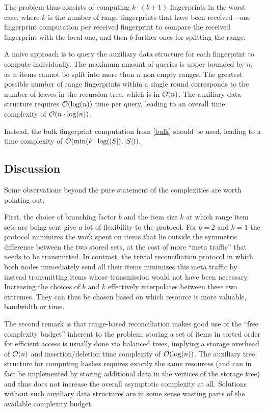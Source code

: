 The problem thus consists of computing $k \cdot (b + 1)$ fingerprints in the worst case, where $k$ is the number of range fingerprints that have been received - one fingerprint computation per received fingerprint to compare the received fingerprint with the local one, and then $b$ further ones for splitting the range.

A naive approach is to query the auxiliary data structure for each fingerprint to compute individually. The maximum amount of queries is upper-bounded by $n$, as $n$ items cannot be split into more than $n$ non-empty ranges. The greatest possible number of range fingerprints within a single round corresponds to the number of leaves in the recursion tree, which is in $\mathcal{O}(n)$. The auxiliary data structure requires $\mathcal{O}(\log(n))$ time per query, leading to an overall time complexity of $\mathcal{O}(n \cdot \log(n))$.

Instead, the bulk fingerprint computation from \cref{bulk} should be used, leading to a time complexity of $\mathcal{O}(\min(k \cdot \log(|{S}|), |{S}|))$.

\subsection{Discussion}

Some observations beyond the pure statement of the complexities are worth pointing out.

First, the choice of branching factor $b$ and the item size $k$ at which range item sets are being sent give a lot of flexibility to the protocol. For $b = 2$ and $k = 1$ the protocol minimizes the work spent on items that lie outside the symmetric difference between the two stored sets, at the cost of more ``meta traffic'' that needs to be transmitted. In contrast, the trivial reconciliation protocol in which both nodes immediately send all their items minimizes this meta traffic by instead transmitting items whose transmission would not have been necessary. Increasing the choices of $b$ and $k$ effectively interpolates between these two extremes. They can thus be chosen based on which resource is more valuable, bandwidth or time.

The second remark is that range-based reconciliation makes good use of the ``free complexity budget'' inherent to the problem: storing a set of items in sorted order for efficient access is usually done via balanced trees, implying a storage overhead of $\mathcal{O}(n)$ and insertion/deletion time complexity of $\mathcal{O}(\log(n))$. The auxiliary tree structure for computing hashes requires exactly the same resources (and can in fact be implemented by storing additional data in the vertices of the storage tree) and thus does not increase the overall asymptotic complexity at all. Solutions without such auxiliary data structures are in some sense wasting parts of the available complexity budget.

